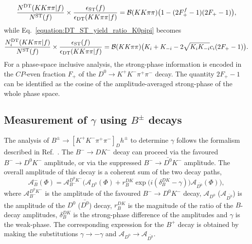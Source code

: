 \documentclass[12pt, a4paper, notitlepage, onecolumn]{article}
\begin{document}
\begin{equation}
    \frac{N^{\rm DT}(KK\pi\pi | f)}{N^{\rm ST}(f)}\times\frac{\epsilon_{\rm ST}(f)}{\epsilon_{\rm DT}(KK\pi\pi | f)} = \mathcal{B}(KK\pi\pi)\big(1 - (2F_+^{f} - 1)(2F_+ - 1)\big),
    \label{equation:DT_ST_yield_ratio_FPlus}
\end{equation}
while Eq.~\eqref{equation:DT_ST_yield_ratio_K0pipi} becomes
\begin{equation}
    \frac{N_i^{\rm DT}(KK\pi\pi | f)}{N^{\rm ST}(f)}\times\frac{\epsilon_{\rm ST}(f)}{\epsilon_{\rm DT}(KK\pi\pi | f)} = \mathcal{B}(KK\pi\pi)\big(K_i + K_{-i} - 2\sqrt{K_iK_{-i}}c_i(2F_+ - 1)\big).
    \label{equation:DT_ST_yield_ratio_K0pipi_FPlus}
\end{equation}
For a phase-space inclusive analysis, the strong-phase information is encoded in the $C\!P$-even fraction $F_+$ of the $D^0\to K^+K^-\pi^+\pi^-$ decay. The quantity $2F_+ - 1$ can be identified as the cosine of the amplitude-averaged strong-phase of the whole phase space.

\subsection{Measurement of \texorpdfstring{$\gamma$}{gamma} using \texorpdfstring{$B^\pm$}{B} decays}
\noindent The analysis of $B^\pm\to[K^+K^-\pi^+\pi^-]_Dh^\pm$ to determine $\gamma$ follows the formalism described in Ref.~\cite{LHCb-PAPER-2020-019}. The $B^-\to DK^-$ decay can proceed via the favoured $B^-\to D^0K^-$ amplitude, or via the suppressed $B^-\to\bar{D^0}K^-$ amplitude. The overall amplitude of this decay is a coherent sum of the two decay paths,
\begin{equation}
    \mathcal{A}_B^-(\Phi) = \mathcal{A}_{B^-}^{D^0K^-}\Big(\mathcal{A}_{D^0}(\Phi) + r_B^{DK}\exp\big(i(\delta_B^{DK} - \gamma)\big)\mathcal{A}_{\bar{D^0}}(\Phi)\Big),
    \label{equation:Bpm_amplitude}
\end{equation}
where $\mathcal{A}_{B^-}^{D^0K^-}$ is the amplitude of the favoured $B^-\to D^0 K^-$ decay, $\mathcal{A}_{D^0}$ ($\mathcal{A}_{\bar{D^0}}$) is the amplitude of the $D^0$ ($\bar{D^0}$) decay, $r_B^{DK}$ is the magnitude of the ratio of the $B$-decay amplitudes, $\delta_B^{DK}$ is the strong-phase difference of the amplitudes and $\gamma$ is the weak-phase. The corresponding expression for the $B^+$ decay is obtained by making the substitutions $\gamma\to -\gamma$ and $\mathcal{A}_{D^0}\to\mathcal{A}_{\bar{D^0}}$.
\end{document}
